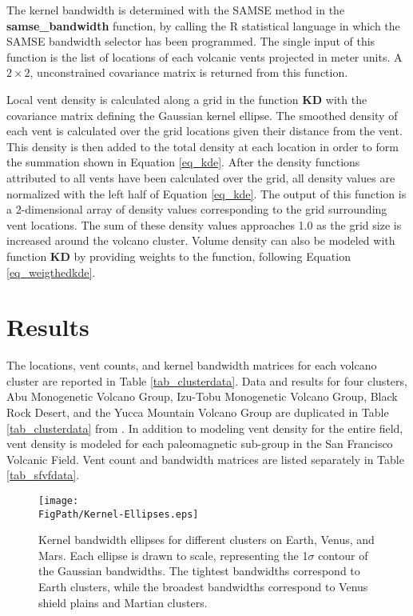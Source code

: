 The kernel bandwidth is determined with the SAMSE method in the \textbf{samse\_bandwidth} function, by calling the R statistical language in which the SAMSE bandwidth selector has been programmed. The single input of this function is the list of locations of each volcanic vents projected in meter units. A $2\times 2$, unconstrained covariance matrix is returned from this function.

Local vent density is calculated along a grid in the function \textbf{KD} with the covariance matrix defining the Gaussian kernel ellipse. The smoothed density of each vent is calculated over the grid locations given their distance from the vent. This density is then added to the total density at each location in order to form the summation shown in Equation \ref{eq_kde}. After the density functions attributed to all vents have been calculated over the grid, all density values are normalized with the left half of Equation \ref{eq_kde}. The output of this function is a 2-dimensional array of density values corresponding to the grid surrounding vent locations. The sum of these density values approaches 1.0 as the grid size is increased around the volcano cluster. Volume density can also be modeled with function \textbf{KD} by providing weights to the function, following Equation \ref{eq_weigthedkde}.

\section{Results}
The locations, vent counts, and kernel bandwidth matrices for each volcano cluster are reported in Table \ref{tab_clusterdata}. Data and results for four clusters, Abu Monogenetic Volcano Group, Izu-Tobu Monogenetic Volcano Group, Black Rock Desert, and the Yucca Mountain Volcano Group are duplicated in Table \ref{tab_clusterdata} from \citet{kiyosugi2012relationship}. In addition to modeling vent density for the entire field, vent density is modeled for each paleomagnetic sub-group in the San Francisco Volcanic Field. Vent count and bandwidth matrices are listed separately in Table \ref{tab_sfvfdata}.

\begin{figure}
\centering
\texttt{[image: \\FigPath/Kernel-Ellipses.eps]}
\caption[Kernel bandwidth ellipses for different clusters on Earth, Venus, and Mars]{Kernel bandwidth ellipses for different clusters on Earth, Venus, and Mars. Each ellipse is drawn to scale, representing the 1$\sigma$ contour of the Gaussian bandwidths. The tightest bandwidths correspond to Earth clusters, while the broadest bandwidths correspond to Venus shield plains and Martian clusters.}
\label{fig_bandwidths}
\end{figure}

